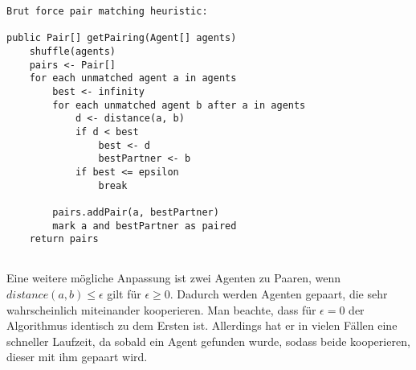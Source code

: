 \begin{lstlisting}
Brut force pair matching heuristic:

public Pair[] getPairing(Agent[] agents) 
	shuffle(agents)
	pairs <- Pair[]
	for each unmatched agent a in agents
		best <- infinity
		for each unmatched agent b after a in agents
			d <- distance(a, b)			
			if d < best
				best <- d
				bestPartner <- b
			if best <= epsilon
				break			
						
		pairs.addPair(a, bestPartner)
		mark a and bestPartner as paired
	return pairs		
	
\end{lstlisting}
Eine weitere mögliche Anpassung ist zwei Agenten zu Paaren, wenn $distance(a, b) \leq \epsilon$ gilt für $\epsilon \geq 0$. Dadurch werden Agenten gepaart, die sehr wahrscheinlich miteinander kooperieren. Man beachte, dass für $\epsilon = 0$ der Algorithmus identisch zu dem Ersten ist. Allerdings hat er in vielen Fällen eine schneller Laufzeit, da sobald ein Agent gefunden wurde, sodass beide kooperieren, dieser mit ihm gepaart wird.
